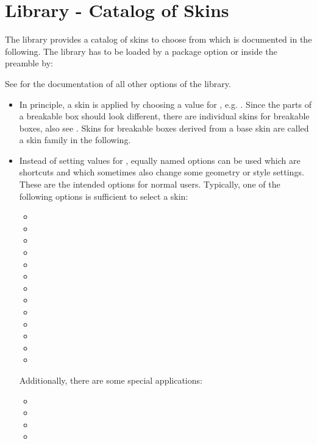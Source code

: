 \clearpage
\section{Library  - Catalog of Skins}\label{sec:skincatalog}%
%
The  library provides a catalog of skins to choose from which
is documented in the following. The  library has to be loaded
by a package option or inside the preamble by:
\begin{dispListing}
\end{dispListing}

See  for the documentation of all other options of the  library.

\begin{itemize}
\item In principle, a skin is applied by choosing a value for
  , e.g. .
  Since the parts of a breakable box should look different,
  there are individual skins for breakable boxes, also see .
  Skins for breakable boxes derived from a base skin are called a skin family
  in the following.
\item Instead of setting values for , equally named options
  can be used which are shortcuts and which sometimes also change some
  geometry or style settings. These are the intended options for normal users.
  Typically, one of the following options is sufficient to select a skin:
  \begin{itemize}
  \item {}
  \item {}
  \item {}
  \item {}
  \item {}
  \item {}
  \item {}
  \item {}
  \item {}
  \item {}
  \item {}
  \item {}
  \item {}
  \end{itemize}
  Additionally, there are some special applications:
  \begin{itemize}
  \item {}
  \item {}
  \item {}
  \item {}
  \end{itemize}
\end{itemize}




